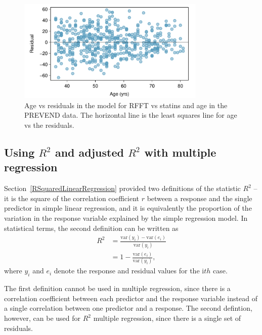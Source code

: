 \begin{figure}[h!]
	\centering
	\includegraphics[width=0.8\textwidth]
	{ch_multiple_linear_regression_oi_biostat/figures/statinAgeResidPlot/statinAgeResidPlot.pdf}
	\caption{Age vs residuals in the model for RFFT vs statins and age in the PREVEND data.  The horizontal line is the least squares line for age vs the residuals.}
	\label{statinAgeResidPlot}
\end{figure}


\subsection{Using $R^2$ and adjusted $R^2$ with multiple regression}


Section~\ref{RSquaredLinearRegression} provided two definitions of the statistic $R^2$ -- it is the square of the correlation coefficient $r$ between a response and the single predictor in simple linear regression, and it is equivalently the proportion of the variation in the response variable explained by the simple regression model.  In statistical terms, the second definition can be written as 
\begin{align*}
   R^2 &= \frac{\text{var}(y_i) - \text{var}(e_i)}
   {\text{var}(y_i)}\\
   &= 1 - \frac{\text{var}(e_i)}{\text{var}(y_i)},
   \label{RSquareDefinition}
\end{align*}
where $y_i$ and $e_i$ denote the response and residual values for the
i$th$ case.

The first definition cannot be used in multiple regression, since there is a correlation coefficient between each predictor and the response variable instead of a single correlation between one predictor and a response.  The second defintion, however, can be used for $R^2$ multiple regression, since there is a single set of residuals.

